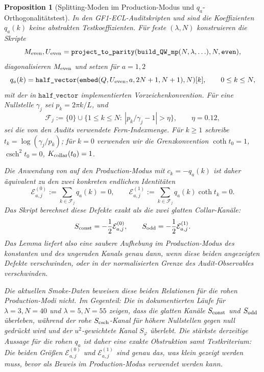 \documentclass[11pt,a4paper]{article}
\newtheorem{proposition}[proposition]{Proposition}
\theoremstyle{remark}
\theoremstyle{plain}
\begin{document}
\begin{proposition}[Splitting-Moden im Production-Modus und \(q_a\)-Orthogonalitätstest]
\label{prop:gf1-production-q-orthogonality-status}
In den GF1-ECL-Auditskripten
 und
 sind die Koeffizienten
\(q_a(k)\) keine abstrakten Testkoeffizienten. Für feste
\((\lambda,N)\) konstruieren die Skripte
\[
  M_{\rm even},U_{\rm even}
  =\texttt{project\_to\_parity}(
      \texttt{build\_QW\_mp}(N,\lambda,\ldots),N,\texttt{even}),
\]
diagonalisieren \(M_{\rm even}\) und setzen für \(a=1,2\)
\[
  q_a(k)
  =
  \texttt{half\_vector}(
    \texttt{embed}(Q,U_{\rm even},a,2N+1,N+1),N)[k],
  \qquad 0\leq k\leq N,
\]
mit der in \(\texttt{half\_vector}\) implementierten Vorzeichenkonvention.
Für eine Nullstelle \(\gamma_j\) sei \(p_k=2\pi k/L\), und
\[
  \mathcal{F}_j
  :=\{0\}\cup\{1\leq k\leq N:\ |p_k/\gamma_j-1|>\eta\},
  \qquad \eta=0.12,
\]
sei die von den Audits verwendete Fern-Indexmenge. Für \(k\geq1\) schreibe
\(t_k=\log(\gamma_j/p_k)\); für \(k=0\) verwenden wir die Grenzkonvention
\(\coth t_0=1\), \(\operatorname{csch}^2t_0=0\), \(K_{\rm collar}(t_0)=1\).

Die Anwendung von  auf den
Production-Modus mit \(c_k=-q_a(k)\) ist daher äquivalent zu den zwei
konkreten endlichen Identitäten
\[
  \mathcal{E}^{(0)}_{a,j}
  :=\sum_{k\in\mathcal{F}_j}q_a(k)=0,
  \qquad
  \mathcal{E}^{(1)}_{a,j}
  :=\sum_{k\in\mathcal{F}_j}q_a(k)\coth t_k=0 .
\]
Das Skript berechnet diese Defekte exakt als die zwei glatten
Collar-Kanäle:
\[
  S_{\rm const}=-\frac12\mathcal{E}^{(0)}_{a,j},
  \qquad
  S_{\rm odd}=-\frac12\mathcal{E}^{(1)}_{a,j}.
\]
Das Lemma liefert also eine saubere Aufhebung im Production-Modus des
konstanten und des ungeraden Kanals genau dann, wenn diese beiden
angezeigten Defekte verschwinden, oder in der normalisierten Grenze des
Audit-Observables verschwinden.

Die aktuellen Smoke-Daten beweisen diese beiden Relationen für die rohen
Production-Modi nicht. Im Gegenteil: Die in
dokumentierten Läufe für \(\lambda=3,N=40\) und \(\lambda=5,N=55\)
zeigen, dass die glatten Kanäle \(S_{\rm const}\) und \(S_{\rm odd}\)
überleben, während der rohe \(S_{\rm csch}\)-Kanal für höhere Nullstellen
gegen null gedrückt wird und der \(u^2\)-gewichtete Kanal \(S_\varphi\)
überlebt. Die stärkste derzeitige Aussage für die rohen \(q_a\) ist daher
eine exakte Obstruktion samt Testkriterium: Die beiden Größen
\(\mathcal{E}^{(0)}_{a,j}\) und \(\mathcal{E}^{(1)}_{a,j}\) sind genau das,
was klein gezeigt werden muss, bevor
 als Beweis im Production-Modus
verwendet werden kann.
\end{proposition}
\end{document}
